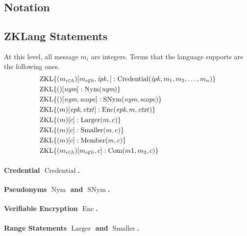 
\subsection{Notation}


\subsection{ZKLang Statements}

At this level, all message $m_i$ are integers.
Terms that the language supports are the following ones.
\begin{align}
&\operatorname{ZKL}\lbrace(m_{i\in h})[m_{i\not\in h},\mathit{ipk},]: \operatorname{Credential}( \mathit{ipk}, m_1, m_2, \ldots, m_n) \rbrace\\
&\operatorname{ZKL}\lbrace()[\emph{nym}]: \operatorname{Nym}( \emph{nym}) \rbrace\\
&\operatorname{ZKL}\lbrace()[\emph{nym},\mathit{scope}]: \operatorname{SNym}( \emph{nym}, \mathit{scope}) \rbrace\\
&\operatorname{ZKL}\lbrace(m)[\emph{epk},\mathit{ctxt}]: \operatorname{Enc}( \emph{epk}, m, \mathit{ctxt}) \rbrace\\
&\operatorname{ZKL}\lbrace(m)[c]: \operatorname{Larger}(m, c) \rbrace\\
&\operatorname{ZKL}\lbrace(m)[c]: \operatorname{Smaller}(m, c) \rbrace \\
&\operatorname{ZKL}\lbrace(m)[c]: \operatorname{Member}(m, c) \rbrace \\
&\operatorname{ZKL}\lbrace(m_{i\in h})[m_{i\not\in h},c]: \operatorname{Com}(m1, m_2, c) \rbrace
\end{align}

\paragraph{Credential $\operatorname{Credential}$.}

\paragraph{Pseudonyms $\operatorname{Nym}$ and $\operatorname{SNym}$.}

\paragraph{Verifiable Encryption  $\operatorname{Enc}$.}

\paragraph{Range Statements $\operatorname{Larger}$ and $\operatorname{Smaller}$.}

